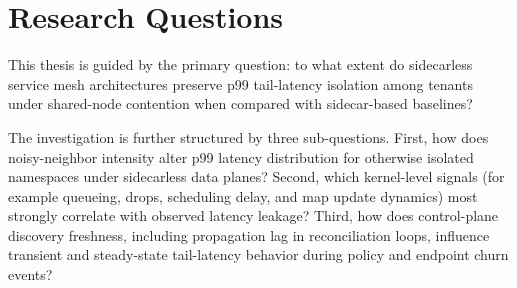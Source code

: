 \section{Research Questions}
This thesis is guided by the primary question: to what extent do sidecarless service mesh architectures preserve p99 tail-latency isolation among tenants under shared-node contention when compared with sidecar-based baselines?

The investigation is further structured by three sub-questions. First, how does noisy-neighbor intensity alter p99 latency distribution for otherwise isolated namespaces under sidecarless data planes? Second, which kernel-level signals (for example queueing, drops, scheduling delay, and map update dynamics) most strongly correlate with observed latency leakage? Third, how does control-plane discovery freshness, including propagation lag in reconciliation loops, influence transient and steady-state tail-latency behavior during policy and endpoint churn events?

